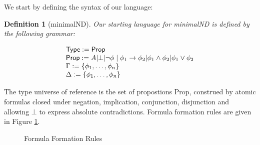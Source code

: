\documentclass[]{article}
\newtheorem{definition}{Definition}
\begin{document}
We start by defining the syntax of our language:

\begin{definition}[{\sf minimalND}]

 Our starting language for {\sf minimalND} is defined by the following grammar:

\begin{displaymath}
\begin{array}{l}
{\sf Type}:={\sf Prop}\\
{\sf Prop}:= A | \bot | \neg \phi \mid \phi_{1} \rightarrow \phi_{2} | \phi_{1} \wedge \phi_{2} | \phi_{1} \vee \phi_{2}\\
\Gamma := \{\phi_{1}, \dots, \phi_{n}\}\\
\Delta := \{\phi_{1}, \dots, \phi_{n}\}

\end{array}
\end{displaymath}
\end{definition}

%
The type universe of reference is the set of propostions {\sf Prop}, construed by atomic formulas closed under negation, implication, conjunction, disjunction and allowing $\bot$ to express absolute contradictions. Formula formation rules are given in Figure \ref{fig:formulaconstructions}.

\begin{figure}[h!]
\caption{Formula Formation Rules}\label{fig:formulaconstructions}
\end{figure}
\end{document}
